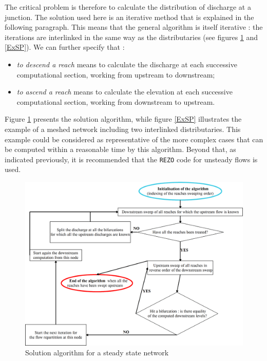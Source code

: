 \vspace{0.5cm}

The critical problem is therefore to calculate the distribution of discharge at a junction. The solution used here is an iterative method that is explained in the following paragraph. This means that the general algorithm is itself iterative : the iterations are interlinked in the same way as the distributaries (see figures \ref{AlgSP} and \ref{ExSP}). We can further specify that :
\begin{itemize}
 \item \textit{to descend a reach} means to calculate the discharge at each successive computational section, working from upstream to downstream;
 \item \textit{to ascend a reach} means to calculate the elevation at each successive computational section, working from downstream to upstream.
\end{itemize}

\vspace{0.5cm}

Figure \ref{AlgSP} presents the solution algorithm, while figure \ref{ExSP} illustrates the example of a meshed network including two interlinked distributaries. This example could be considered as representative of the more complex cases that can be computed within a reasonable time by this algorithm. Beyond that, as indicated previously, it is recommended that the \texttt{REZO} code for unsteady flows is used.

\vspace{0.5cm}

\begin{figure}
 \begin{center}
  \includegraphics[scale=0.15,angle=0]{Figures/Algorithm_SARAP.eps}
  \caption{Solution algorithm for a steady state network}
  \label{AlgSP}
 \end{center}
\end{figure}


